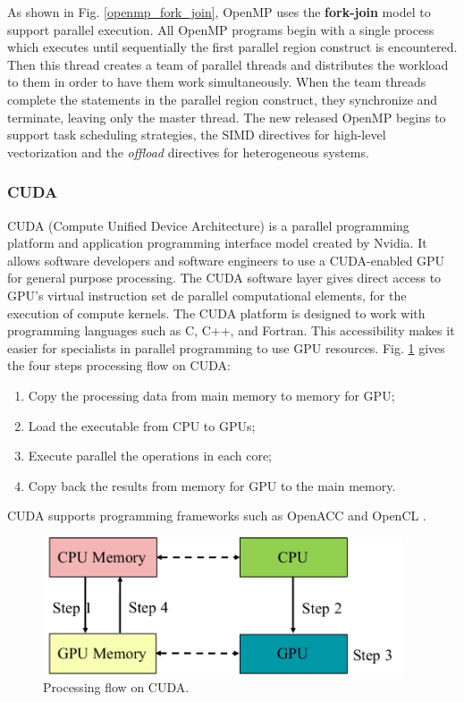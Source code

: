 As shown in Fig. \ref{openmp_fork_join}, OpenMP uses the \textbf{fork-join} model to support parallel execution. All OpenMP programs begin with a single process which executes until sequentially the first parallel region construct is encountered.  Then this thread creates a team of parallel threads and distributes the workload to them in order to have them work simultaneously. When the team threads complete the statements in the parallel region construct, they synchronize and terminate, leaving only the master thread. The new released OpenMP begins to support task scheduling strategies, the SIMD directives for high-level vectorization and the \textit{offload} directives for heterogeneous systems.

\subsubsection{CUDA}

CUDA (Compute Unified Device Architecture) \cite{nvidia2011nvidia} is a parallel programming platform and application programming interface model created by Nvidia. It allows software developers and software engineers to use a CUDA-enabled GPU for general purpose processing. The CUDA software layer gives direct access to GPU's virtual instruction set de parallel computational elements, for the execution of compute kernels. The CUDA platform is designed to work with programming languages such as C, C++, and Fortran. This accessibility makes it easier for specialists in parallel programming to use GPU resources. Fig. \ref{cuda_flow} gives the four steps processing flow on CUDA:

\begin{enumerate}
	\item Copy the processing data from main memory to memory for GPU;
	\item Load the executable from CPU to GPUs;
	\item Execute parallel the operations in each core;
	\item Copy back the results from memory for GPU to the main memory.
\end{enumerate}

CUDA supports programming frameworks such as OpenACC \cite{wienke2012openacc} and OpenCL \cite{munshi2009opencl}. 

\begin{figure}[htbp]
	\centering
	\includegraphics[width=4.2in]{fig/CUDA.pdf}
	\caption{Processing flow on CUDA.}
	\label{cuda_flow}
\end{figure}

